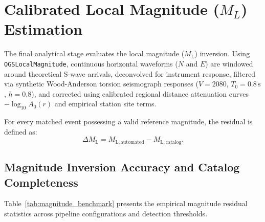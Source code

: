 \section{Calibrated Local Magnitude ($M_L$) Estimation}
\label{sec:magnitude_benchmarking}

The final analytical stage evaluates the local magnitude ($M_{\mathrm{L}}$) inversion. Using \texttt{OGSLocalMagnitude}, continuous horizontal waveforms ($N$ and $E$) are windowed around theoretical S-wave arrivals, deconvolved for instrument response, filtered via synthetic Wood-Anderson torsion seismograph responses ($V=2080$, $T_0=0.8\,\unit{\second}$, $h=0.8$), and corrected using calibrated regional distance attenuation curves $-\log_{10} A_0(r)$ and empirical station site terms.

For every matched event possessing a valid reference magnitude, the residual is defined as:
\begin{equation}
  \Delta M_{\mathrm{L}} = M_{\mathrm{L}, \mathrm{automated}} - M_{\mathrm{L}, \mathrm{catalog}}.
\end{equation}

\subsection{Magnitude Inversion Accuracy and Catalog Completeness}
\label{subsec:magnitude_residuals}

Table~\ref{tab:magnitude_benchmark} presents the empirical magnitude residual statistics across pipeline configurations and detection thresholds.

